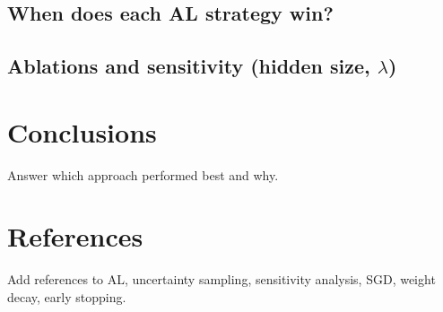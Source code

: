 \documentclass[11pt]{article}
\begin{document}
\subsection{When does each AL strategy win?}
\subsection{Ablations and sensitivity (hidden size, $\lambda$)}

\section{Conclusions}
Answer which approach performed best and why.

\section*{References}
Add references to AL, uncertainty sampling, sensitivity analysis, SGD, weight decay, early stopping.
\end{document}
